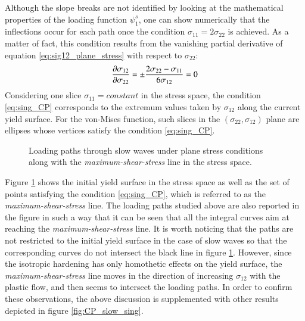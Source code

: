 Although the slope breaks are not identified by looking at the mathematical properties of the loading function $\psi^s_1$, one can show numerically that the inflections occur for each path once the condition $\sigma_{11}=2\sigma_{22}$ is achieved.
As a matter of fact, this condition results from the vanishing partial derivative of equation \eqref{eq:sig12_plane_stress} with respect to $\sigma_{22}$:
\begin{equation}
  \label{eq:sing_CP}
  \frac{\partial \sigma_{12}}{\partial \sigma_{22}} =  \pm\frac{2\sigma_{22} - \sigma_{11}}{6 \sigma_{12}} =0
\end{equation}
Considering one slice $\sigma_{11}=constant$ in the stress space, the condition \eqref{eq:sing_CP} corresponds to the extremum values taken by $\sigma_{12}$ along the current yield surface.
For the von-Mises function, such slices in the  $(\sigma_{22},\sigma_{12})$ plane are ellipses whose vertices satisfy the condition \eqref{eq:sing_CP}.
\begin{figure}[h!]
  \centering
  
  \caption{Loading paths through slow waves under plane stress conditions along with the \textit{maximum-shear-stress} line in the stress space.}
  \label{fig:CP_slow_sing_yield}
\end{figure}
Figure \ref{fig:CP_slow_sing_yield} shows the initial yield surface in the stress space as well as the set of points satisfying the condition \eqref{eq:sing_CP}, which is referred to as the \textit{maximum-shear-stress} line.
The loading paths studied above are also reported in the figure in such a way that it can be seen that all the integral curves aim at reaching the \textit{maximum-shear-stress} line.
It is worth noticing that the paths are not restricted to the initial yield surface in the case of slow waves so that the corresponding curves do not intersect the black line in figure \ref{fig:CP_slow_sing_yield}.
However, since the isotropic hardening has only homothetic effects on the yield surface, the \textit{maximum-shear-stress} line moves in the direction of increasing $\sigma_{12}$ with the plastic flow, and then seems to intersect the loading paths.
In order to confirm these observations, the above discussion is supplemented with other results depicted in figure \ref{fig:CP_slow_sing}.


